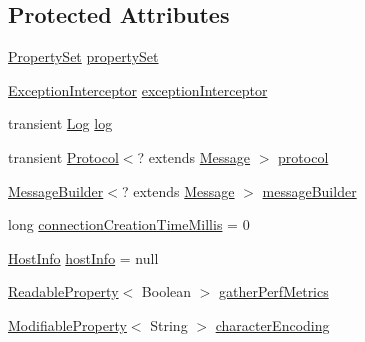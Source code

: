 \subsection*{Protected Attributes}
\begin{DoxyCompactItemize}
\item 
\mbox{\hyperlink{interfacecom_1_1mysql_1_1cj_1_1conf_1_1_property_set}{Property\+Set}} \mbox{\hyperlink{classcom_1_1mysql_1_1cj_1_1_core_session_aaa42c32fbec5d044050f66d5bd9ed1cd}{property\+Set}}
\item 
\mbox{\hyperlink{interfacecom_1_1mysql_1_1cj_1_1exceptions_1_1_exception_interceptor}{Exception\+Interceptor}} \mbox{\hyperlink{classcom_1_1mysql_1_1cj_1_1_core_session_a60aecfa7655db14a1c4d4c2e7bbfab64}{exception\+Interceptor}}
\item 
transient \mbox{\hyperlink{interfacecom_1_1mysql_1_1cj_1_1log_1_1_log}{Log}} \mbox{\hyperlink{classcom_1_1mysql_1_1cj_1_1_core_session_a6926baf1d1d13a6ebdced04244ebfe3d}{log}}
\item 
transient \mbox{\hyperlink{interfacecom_1_1mysql_1_1cj_1_1protocol_1_1_protocol}{Protocol}}$<$? extends \mbox{\hyperlink{interfacecom_1_1mysql_1_1cj_1_1protocol_1_1_message}{Message}} $>$ \mbox{\hyperlink{classcom_1_1mysql_1_1cj_1_1_core_session_adaf1b16630ef19f657dd0b191ee51fe2}{protocol}}
\item 
\mbox{\hyperlink{interfacecom_1_1mysql_1_1cj_1_1_message_builder}{Message\+Builder}}$<$? extends \mbox{\hyperlink{interfacecom_1_1mysql_1_1cj_1_1protocol_1_1_message}{Message}} $>$ \mbox{\hyperlink{classcom_1_1mysql_1_1cj_1_1_core_session_a563e6b084b83c72df32f407cd6c201ac}{message\+Builder}}
\item 
long \mbox{\hyperlink{classcom_1_1mysql_1_1cj_1_1_core_session_afe99c9d8a829f985f424087e61f4cad6}{connection\+Creation\+Time\+Millis}} = 0
\item 
\mbox{\hyperlink{classcom_1_1mysql_1_1cj_1_1conf_1_1_host_info}{Host\+Info}} \mbox{\hyperlink{classcom_1_1mysql_1_1cj_1_1_core_session_ac60f96087dc4f9a719f136f8fb74fddf}{host\+Info}} = null
\item 
\mbox{\hyperlink{interfacecom_1_1mysql_1_1cj_1_1conf_1_1_readable_property}{Readable\+Property}}$<$ Boolean $>$ \mbox{\hyperlink{classcom_1_1mysql_1_1cj_1_1_core_session_a2c48e0425ac9766f888c25ae3705d501}{gather\+Perf\+Metrics}}
\item 
\mbox{\hyperlink{interfacecom_1_1mysql_1_1cj_1_1conf_1_1_modifiable_property}{Modifiable\+Property}}$<$ String $>$ \mbox{\hyperlink{classcom_1_1mysql_1_1cj_1_1_core_session_a3dba50e7a4c89b198f729e4afdf8a081}{character\+Encoding}}

\end{DoxyCompactItemize}
